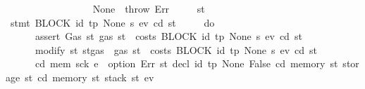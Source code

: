 \begin{isabellebody}
\ \ \ \ \ \ \ \ \ \ {\isacharbraceright}{\kern0pt}\isanewline
\ \ \ \ \ \ {\isacharbar}{\kern0pt}\ None\ {\isasymRightarrow}\ throw\ Err\isanewline
\ \ \ \ {\isacharbraceright}{\kern0pt}{\isacharparenright}{\kern0pt}\ st{\isachardoublequoteclose}\isanewline
{\isacharbar}{\kern0pt}\ {\isachardoublequoteopen}stmt\ {\isacharparenleft}{\kern0pt}BLOCK\ {\isacharparenleft}{\kern0pt}{\isacharparenleft}{\kern0pt}id{}{\isacharcomma}{\kern0pt}\ tp{\isacharparenright}{\kern0pt}{\isacharcomma}{\kern0pt}\ None{\isacharparenright}{\kern0pt}\ s{\isacharparenright}{\kern0pt}\ e\isactrlsub v\ cd\ st\ {\isacharequal}{\kern0pt}\isanewline
\ \ \ \ {\isacharparenleft}{\kern0pt}do\ {\isacharbraceleft}{\kern0pt}\isanewline
\ \ \ \ \ \ assert\ Gas\ {\isacharparenleft}{\kern0pt}{\isasymlambda}st{\isachardot}{\kern0pt}\ gas\ st\ {\isachargreater}{\kern0pt}\ costs\ {\isacharparenleft}{\kern0pt}BLOCK\ {\isacharparenleft}{\kern0pt}{\isacharparenleft}{\kern0pt}id{}{\isacharcomma}{\kern0pt}\ tp{\isacharparenright}{\kern0pt}{\isacharcomma}{\kern0pt}\ None{\isacharparenright}{\kern0pt}\ s{\isacharparenright}{\kern0pt}\ e\isactrlsub v\ cd\ st{\isacharparenright}{\kern0pt}{\isacharsemicolon}{\kern0pt}\isanewline
\ \ \ \ \ \ modify\ {\isacharparenleft}{\kern0pt}{\isasymlambda}st{\isachardot}{\kern0pt}\ st{\isasymlparr}gas\ {\isacharcolon}{\kern0pt}{\isacharequal}{\kern0pt}\ gas\ st\ {\isacharminus}{\kern0pt}\ costs\ {\isacharparenleft}{\kern0pt}BLOCK\ {\isacharparenleft}{\kern0pt}{\isacharparenleft}{\kern0pt}id{}{\isacharcomma}{\kern0pt}\ tp{\isacharparenright}{\kern0pt}{\isacharcomma}{\kern0pt}\ None{\isacharparenright}{\kern0pt}\ s{\isacharparenright}{\kern0pt}\ e\isactrlsub v\ cd\ st{\isasymrparr}{\isacharparenright}{\kern0pt}{\isacharsemicolon}{\kern0pt}\isanewline
\ \ \ \ \ \ {\isacharparenleft}{\kern0pt}cd{\isacharprime}{\kern0pt}{\isacharcomma}{\kern0pt}\ mem{\isacharprime}{\kern0pt}{\isacharcomma}{\kern0pt}\ sck{\isacharprime}{\kern0pt}{\isacharcomma}{\kern0pt}\ e{\isacharprime}{\kern0pt}{\isacharparenright}{\kern0pt}\ {\isasymleftarrow}\ option\ Err\ {\isacharparenleft}{\kern0pt}{\isasymlambda}st{\isachardot}{\kern0pt}\ decl\ id{}\ tp\ None\ False\ cd\ {\isacharparenleft}{\kern0pt}memory\ st{\isacharparenright}{\kern0pt}\ {\isacharparenleft}{\kern0pt}storage\ st{\isacharparenright}{\kern0pt}\ {\isacharparenleft}{\kern0pt}cd{\isacharcomma}{\kern0pt}\ memory\ st{\isacharcomma}{\kern0pt}\ stack\ st{\isacharcomma}{\kern0pt}\ e\isactrlsub v{\isacharparenright}{\kern0pt}{\isacharparenright}{\kern0pt}{\isacharsemicolon}{\kern0pt}\isanewline

\end{isabellebody}
